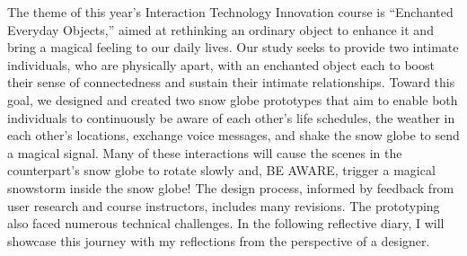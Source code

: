 The theme of this year's Interaction Technology Innovation course is “Enchanted Everyday Objects,” aimed at rethinking an ordinary object to enhance it and bring a magical feeling to our daily lives. Our study seeks to provide two intimate individuals, who are physically apart, with an enchanted object each to boost their sense of connectedness and sustain their intimate relationships. Toward this goal, we designed and created two snow globe prototypes that aim to enable both individuals to continuously be aware of each other’s life schedules, the weather in each other’s locations, exchange voice messages, and shake the snow globe to send a magical signal. Many of these interactions will cause the scenes in the counterpart’s snow globe to rotate slowly and, BE AWARE, trigger a magical snowstorm inside the snow globe! The design process, informed by feedback from user research and course instructors, includes many revisions. The prototyping also faced numerous technical challenges. In the following reflective diary, I will showcase this journey with my reflections from the perspective of a designer.